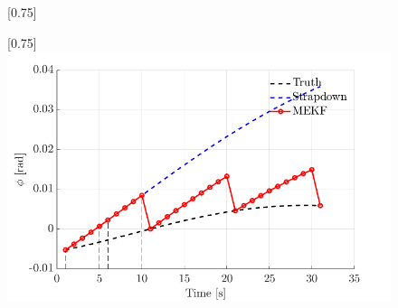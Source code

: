 \documentclass[preview]{standalone}
\begin{document}
	\begin{figure}
		\centering
		\scalebox{0.75}[0.75]{}
	\end{figure}
	\begin{figure}
		\centering
		\scalebox{0.75}[0.75]{\includegraphics{mekf.png}}
	\end{figure}
\end{document}
